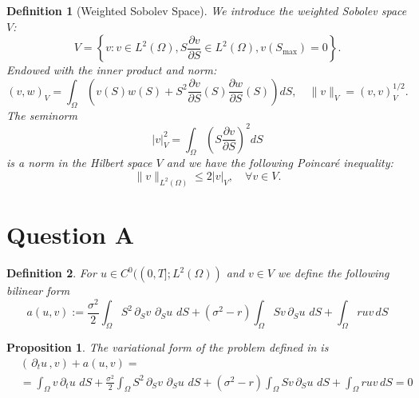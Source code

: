 \documentclass{article}
\newtheorem{df}{Definition}[section]
\newtheorem{prop}[thm]{Proposition}
\newcommand{\intS}[1]{\ensuremath{\int_{\Omega}#1 \, dS}}
\newcommand{\darg}[2]{\ensuremath{\, \partial_{#2}#1} \, }
\newcommand{\dt}[1]{\ensuremath{\darg{#1}{t}}}
\newcommand{\dS}[1]{\ensuremath{\darg{#1}{S}}}
\newcommand{\dtu}{\dt{u}}
\newcommand{\sigmafrac}{\ensuremath{\frac{\sigma^2}{2}}}
\newcommand{\czero}{\ensuremath{C^0((0,T];L^2(\Omega))}}
\newcommand{\aform}[2]{\ensuremath{\sigmafrac \intS{S^2 \dS{#2} \dS{#1}} + (\sigma^2 - r) \intS{S #2 \dS{#1}} + \intS{r  #1  #2}}}
\newcommand{\auv}{\aform{u}{v}}
\begin{document}
\begin{df}[Weighted Sobolev Space]
We introduce the weighted Sobolev space \( V \):
\[
V = \left\{ v : v \in L^2(\Omega), S \frac{\partial v}{\partial S} \in L^2(\Omega), v(S_{\max}) = 0 \right\}.
\]
Endowed with the inner product and norm:
\[
(v, w)_V = \int_\Omega \left( v(S) w(S) + S^2 \frac{\partial v}{\partial S}(S) \frac{\partial w}{\partial S}(S) \right) dS, \quad \| v \|_V = (v, v)_V^{1/2}.
\]
The seminorm
\[
|v|_V^2 = \int_\Omega \left( S \frac{\partial v}{\partial S} \right)^2 dS
\]
is a norm in the Hilbert space \( V \) and we have the following Poincaré inequality:
\[
\| v \|_{L^2(\Omega)} \leq 2 |v|_V, \quad \forall v \in V.
\]
\end{df}

\section{Question A}
\begin{df}\label{def:a}
    For $u \in \czero$ and $v \in V$ we define the following bilinear form
    \begin{equation*}
        a(u,v) := \auv
    \end{equation*}
\end{df}
\begin{prop}\label{prop:variational_form}
    The variational form of the problem defined in  is
    \begin{align*}
    &\left( \dtu, v\right) + a(u,v) = \\
    &= \intS{v \dtu} + \auv = 0
    \end{align*}
\end{prop}
\end{document}
